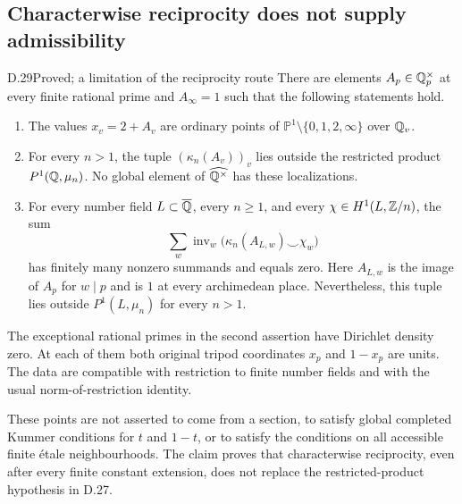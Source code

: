 \subsection{Characterwise reciprocity does not supply admissibility}

\begin{claim}{D.29}{Proved; a limitation of the reciprocity route}\label{clm:D29}
There are elements $A_p\in\mathbb Q_p^\times$ at every finite
rational prime and $A_\infty=1$ such that the following
statements hold.
\begin{enumerate}
\item The values $x_v=2+A_v$ are ordinary points of
$\mathbb P^1\setminus\{0,1,2,\infty\}$ over $\mathbb Q_v$.
\item For every $n>1$, the tuple
$(\kappa_n(A_v))_v$ lies outside the restricted product
$P^1(\mathbb Q,\mu_n)$. No global element of
$\widehat{\mathbb Q^\times}$ has these localizations.
\item For every number field $L\subset\overline{\mathbb Q}$, every
$n\ge1$, and every $\chi\in H^1(L,\mathbb Z/n)$, the sum
\[
 \sum_w\operatorname{inv}_w
       \bigl(\kappa_n(A_{L,w})\smile\chi_w\bigr)           \tag{D.29.1}
\]
has finitely many nonzero summands and equals zero. Here
$A_{L,w}$ is the image of $A_p$ for $w\mid p$ and is $1$
at every archimedean place. Nevertheless, this tuple lies
outside $P^1(L,\mu_n)$ for every $n>1$.
\end{enumerate}
The exceptional rational primes in the second assertion
have Dirichlet density zero. At each of them both original
tripod coordinates $x_p$ and $1-x_p$ are units. The data
are compatible with restriction to finite number fields and
with the usual norm-of-restriction identity.

These points are not asserted to come from a section, to
satisfy global completed Kummer conditions for $t$ and
$1-t$, or to satisfy the conditions on all accessible finite
\'etale neighbourhoods. The claim proves that characterwise
reciprocity, even after every finite constant extension,
does not replace the restricted-product hypothesis in D.27.
\end{claim}
